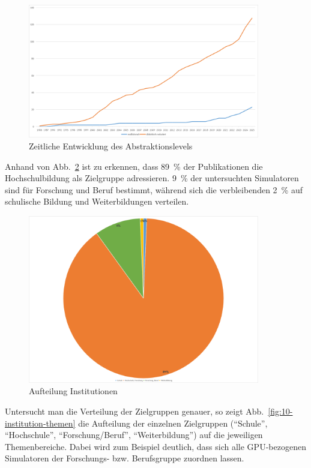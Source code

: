\begin{figure}[!htbp]
    \centering
    \caption{Zeitliche Entwicklung des Abstraktionslevels}
    \label{fig:8-abstraktion-jahr}
    \includegraphics[width=0.90\textwidth]{graphics/8-abstraktion-jahr.png}
\end{figure}

Anhand von Abb.~\ref{fig:9-institution} ist zu erkennen, dass 89~\% der Publikationen die Hochschulbildung als Zielgruppe adressieren. 9~\% der untersuchten Simulatoren sind für Forschung und Beruf bestimmt, während sich die verbleibenden 2~\% auf schulische Bildung und Weiterbildungen verteilen.

\begin{figure}[!htbp]
    \centering
    \caption{Aufteilung Institutionen}
    \label{fig:9-institution}
    \includegraphics[width=0.90\textwidth]{graphics/9-institution2.png}
\end{figure}

Untersucht man die Verteilung der Zielgruppen genauer, so zeigt Abb.~\ref{fig:10-institution-themen} die Aufteilung der einzelnen Zielgruppen (\enquote{Schule}, \enquote{Hochschule}, \enquote{Forschung/Beruf}, \enquote{Weiterbildung}) auf die jeweiligen Themenbereiche. Dabei wird zum Beispiel deutlich, dass sich alle GPU-bezogenen Simulatoren der Forschungs- bzw. Berufsgruppe zuordnen lassen.

